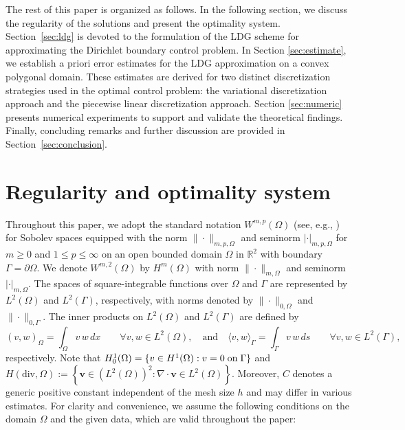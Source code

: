 \documentclass[a4paper,10pt]{article}
\numberwithin{theorem}{section}
\newcommand{\x}[2][blue]{#2}
\begin{document}

The rest of this paper is organized as follows. \x{In the following section, we discuss the regularity of the solutions and present the optimality system.} Section~\ref{sec:ldg} is devoted to the formulation of the LDG scheme for approximating the Dirichlet boundary control problem. In Section \ref{sec:estimate}, we establish a priori error estimates for the LDG approximation on a convex polygonal domain. These estimates are derived for two distinct discretization strategies used in the optimal control problem: the variational discretization approach and the piecewise linear discretization approach. Section \ref{sec:numeric} presents numerical experiments to support and validate the theoretical findings. Finally, concluding remarks and further discussion are provided in  Section~\ref{sec:conclusion}.


\section{Regularity and optimality system}\label{sec:regularity}

Throughout this paper, we adopt the standard notation $W^{m,p}(\Omega)$ (see, e.g., \cite{RAAdams_1975}) for Sobolev spaces  equipped with the norm $\| \cdot \|_{m,p,\Omega}$ and seminorm $| \cdot |_{m,p,\Omega}$ for $m \geq 0$ and $1 \leq p \leq \infty$ on an open bounded domain $\Omega$ in $\mathbb{R}^2$ with  boundary $\Gamma=\partial \Omega$. We denote $W^{m,2}(\Omega)$ by $H^m(\Omega)$  with  norm $\| \cdot \|_{m,\Omega}$ and seminorm $| \cdot |_{m,\Omega}$. \x{The spaces of square-integrable functions over $\Omega$ and $\Gamma$ are represented by $L^2(\Omega)$ and $L^2(\Gamma)$, respectively, with norms denoted by $\| \cdot \|_{0,\Omega}$ and $\| \cdot \|_{0,\Gamma}$. The inner products on $L^2 (\Omega)$ and $L^2 (\Gamma)$ are defined by}
\[
(v, w)_{\Omega} = \int_{\Omega} v \, w \, dx 
\qquad \forall v, w \in L^2(\Omega),
\quad
\text{and}
\quad
\langle v, w \rangle_{\Gamma} = \int_{\Gamma} v \, w \, ds 
\qquad \forall v, w \in L^2(\Gamma),
\]
respectively. Note that $H^1_0(\Omega) = \{ v \in H^1(\Omega):  v=0 \; \hbox{on}  \; \Gamma \}$ and $H(\mathrm{div},\Omega) := \left\{ \mathbf{v} \in (L^2(\Omega))^2: \nabla \cdot \mathbf{v} \in L^2(\Omega) \right\}$. Moreover, $C$ denotes  a generic positive constant independent of the mesh size $h$  and may differ in various estimates. For clarity and convenience, we assume the following conditions on the domain $\Omega$ and the given data, which are  valid throughout the paper:
\end{document}
